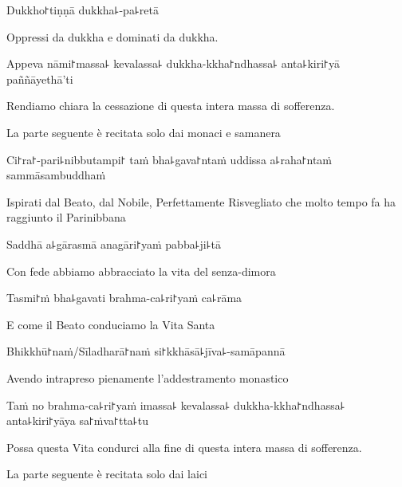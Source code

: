 Dukkho꜓tiṇṇā dukkha꜕-pa꜕retā

\begin{english}
Oppressi da dukkha e dominati da dukkha.
\end{english}

Appeva nāmi꜓massa꜕ kevalassa꜕ dukkha-kkha꜓ndhassa꜕ anta꜕kiri꜓yā \\paññāyethā'ti

\begin{english}
Rendiamo chiara la cessazione di questa intera massa di sofferenza.
\end{english}

\begin{instruction}
  La parte seguente è recitata solo dai monaci e samanera
\end{instruction}

Ci꜓ra꜓-pari꜕nibbutampi꜓ taṁ bha꜕gava꜓ntaṁ uddissa a꜕raha꜓ntaṁ sammāsambuddhaṁ

\begin{english}
Ispirati dal Beato, dal Nobile, Perfettamente Risvegliato che molto tempo fa ha raggiunto il Parinibbana
\end{english}

Saddhā a꜕gārasmā anagāri꜓yaṁ pabba꜕ji꜕tā

\begin{english}
Con fede abbiamo abbracciato la vita del senza-dimora
\end{english}

Tasmi꜓ṁ bha꜕gavati brahma-ca꜕ri꜓yaṁ ca꜕rāma

\begin{english}
E come il Beato conduciamo la Vita Santa
\end{english}

Bhikkhū꜓naṁ/Sīladharā꜓naṁ si꜓kkhāsā꜕jīva꜕-samāpannā

\begin{english}
Avendo intrapreso pienamente l'addestramento monastico
\end{english}

Taṁ no brahma-ca꜕ri꜓yaṁ imassa꜕ kevalassa꜕ dukkha-kkha꜓ndhassa꜕ anta꜕kiri꜓yāya sa꜓ṁva꜓tta꜕tu

\begin{english}
Possa questa Vita condurci alla fine di questa intera massa di sofferenza.
\end{english}

\clearpage

\begin{instruction}
  La parte seguente è recitata solo dai laici
\end{instruction}

